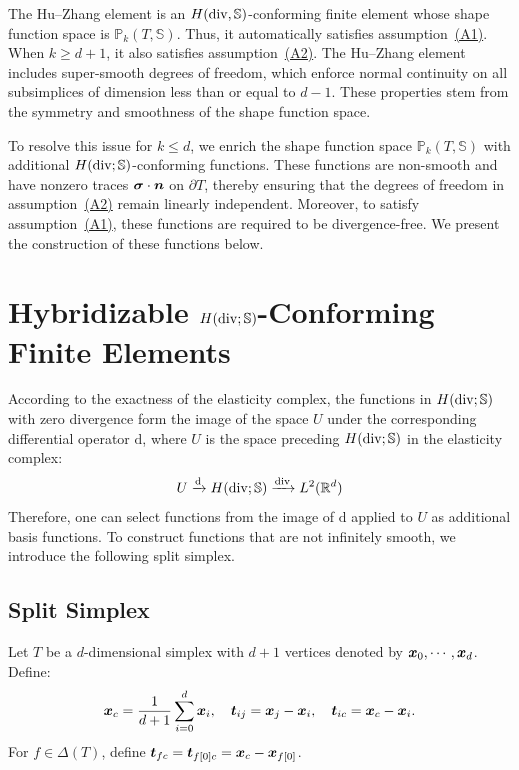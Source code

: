 \documentclass[letterpaper,12pt]{article}
\begin{document}
The Hu–Zhang element is an $H(\mathop{\mathrm{div}}, \mathbb{S})$-conforming finite element whose shape function space is $\mathbb{P}_k(T, \mathbb{S})$. Thus, it automatically satisfies assumption~\hyperref[assumption1prim]{(A1)}. When $k \geq d+1$, it also satisfies assumption~\hyperref[assumption2]{(A2)}. The Hu–Zhang element includes super-smooth degrees of freedom, which enforce normal continuity on all subsimplices of dimension less than or equal to $d-1$. These properties stem from the symmetry and smoothness of the shape function space.

To resolve this issue for $k \leq d$, we enrich the shape function space $\mathbb{P}_k(T, \mathbb{S})$ with additional $H(\mathop{\mathrm{div}}; \mathbb{S})$-conforming functions. These functions are non-smooth and have nonzero traces $\boldsymbol{\sigma} \cdot \boldsymbol{n}$ on $\partial T$, thereby ensuring that the degrees of freedom in assumption~\hyperref[assumption2]{(A2)} remain linearly independent. Moreover, to satisfy assumption~\hyperref[assumption1prim]{(A1)}, these functions are required to be divergence-free. We present the construction of these functions below.

\section{Hybridizable $H(\mathop{\mathrm{div}}; \mathbb{S})$-Conforming Finite Elements}

According to the exactness of the elasticity complex, the functions in $H(\mathop{\mathrm{div}}; \mathbb{S})$ with zero divergence form the image of the space $U$ under the corresponding differential operator $\mathrm{d}$, where $U$ is the space preceding $H(\mathop{\mathrm{div}}; \mathbb{S})$ in the elasticity complex:
\begin{equation}
    \label{eq:hilbertcomplex}
    U \xrightarrow{\mathrm{d}} H(\mathop{\mathrm{div}}; \mathbb{S})
    \xrightarrow{\mathop{\mathrm{div}}} L^2(\mathbb{R}^d)
\end{equation}
Therefore, one can select functions from the image of $\mathrm{d}$ applied to $U$ as additional basis functions. To construct functions that are not infinitely smooth, we introduce the following split simplex.

\subsection{Split Simplex}

Let $T$ be a $d$-dimensional simplex with $d+1$ vertices denoted by $\boldsymbol{x}_0, \cdots, \boldsymbol{x}_d$. Define:
$$
\boldsymbol{x}_c = \frac{1}{d+1}\sum_{i=0}^d \boldsymbol{x}_i, \quad
\boldsymbol{t}_{ij} = \boldsymbol{x}_j - \boldsymbol{x}_i, \quad \boldsymbol{t}_{ic} =
\boldsymbol{x}_c - \boldsymbol{x}_i.
$$
For $f \in \Delta(T)$, define $\boldsymbol{t}_{fc} = \boldsymbol{t}_{f[0]c} = \boldsymbol{x}_c - \boldsymbol{x}_{f[0]}$.
\end{document}
